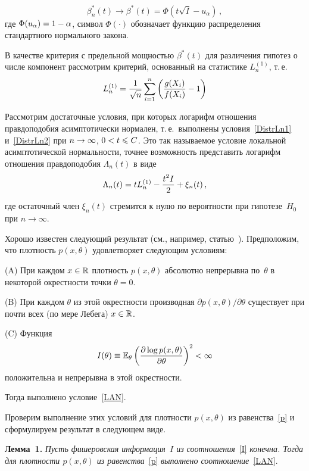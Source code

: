 \begin{multicols}{2}
\noindent
$$
\beta^*_n(t)\rightarrow\beta^*(t)=\Phi(t\sqrt{I}-u_\alpha)\,,
$$
где $\Phi(u_\alpha)\hm=1\hm-\alpha$, символ $\Phi(\cdot)$ обозначает
функцию распределения стандартного нормального закона.

В качестве критерия с предельной мощностью $\beta^*(t)$ для
различения гипотез о числе компонент рассмотрим критерий, основанный
на статистике $L_n^{(1)}$, т.\,е.\
\begin{equation}
\label{L_n^1}L_n^{(1)}=\displaystyle\frac{\displaystyle 1\mathstrut}{\displaystyle \sqrt{n}\mathstrut}\sum\limits_{i=1}^{n}\left(\displaystyle\frac{\displaystyle g(X_i)\mathstrut}{\displaystyle f(X_i)\mathstrut}-1\right)
\end{equation}

Рассмотрим достаточные условия, при которых логарифм отношения
правдоподобия асимптотически нормален, т.\,е.\ выполнены
условия~\eqref{DistrLn1} и~\eqref{DistrLn2} при $n\hm\to\infty$,
$0\hm<t\hm\leqslant C$. Это так называемое условие локальной асимптотической
нор\-маль\-ности, точнее возможность представить логарифм отношения
правдоподобия $\Lambda_n(t)$ в виде
\begin{equation}
\label{LAN} \Lambda_n(t)=t L_n^{(1)}-\displaystyle\frac{\displaystyle t^2 I\mathstrut}{\displaystyle 2\mathstrut}+\xi_n(t)\,,
\end{equation}
где остаточный член $\xi_n(t)$ стремится к нулю по вероятности при
гипотезе~$H_0$ при $n\to\infty$.

Хорошо известен следующий результат (см., например,
статью~\cite{Hajek1962}). Предположим, что плотность $p(x,\theta)$
удовлетворяет следующим условиям:
\begin{description}
\item{{(A)}} При каждом $x\in\mathbb{R}$ плотность $p(x,\theta)$
абсолютно непрерывна по~$\theta$ в некоторой окрестности точки
$\theta=0$.
\item{{(B)}} При каждом $\theta$ из этой окрестности производная
$\partial p(x,\theta)/\partial\theta$ существует при почти
всех (по мере Лебега) $x\in\mathbb{R}$.
\item{{(C)}} Функция 
$$
I(\theta)\equiv\mathbb E_\theta\left(\displaystyle\frac{\displaystyle \partial
\log p(x,\theta)\mathstrut}{\displaystyle \partial\theta\mathstrut}\right)^2<\infty
$$ 
положительна и непрерывна в этой окрест\-ности.
\end{description}
Тогда выполнено условие~\eqref{LAN}.

Проверим выполнение этих условий для плотности $p(x,\theta)$ из
равенства~\eqref{p} и сформулируем результат в следующем виде.

\medskip

\noindent
\textbf{Лемма~1.} \textit{Пусть фишеровская информация~$I$ из
соотношения}~\eqref{I} \textit{конечна. Тогда для плотности $p(x,\theta)$ из
равенства}~\eqref{p} \textit{выполнено соотношение}~\eqref{LAN}.


\end{multicols}
